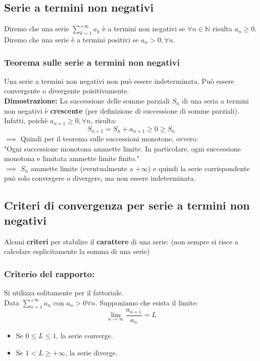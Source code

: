 \documentclass[../main.tex]{subfiles}
\begin{document}
\subsection{Serie a termini non negativi}
Diremo che una serie $\sum_{k=1}^{+\infty}a_k$ è a termini non negativi se
$\forall n\in \mathbb{N}$ risulta $a_n \geq 0$.\\ Diremo che una serie è a
termini positivi se $a_n>0, \forall n$.

\subsubsection{Teorema sulle serie a termini non negativi}
Una serie a termini non negativi non può essere indeterminata. Può essere
convergente o divergente poisitivamente.\\ \textbf{Dimostrazione:} La
successione delle somme parziali $S_n$ di una seria a termini non negativi è
\textbf{crescente} (per definizione di successione di somme parziali).\\
Infatti, poichè $a_{n+1}\geq 0, \forall n$, risulta:
\[
    S_{n+1} = S_n + a_{n+1} \geq 0 \geq S_n
\]
$\implies$ Quindi per il teorema sulle successioni monotone, ovvero:\\
"Ogni successione monotona ammette limite. In particolare, ogni successione monotona e limitata ammette limite finito."\\
$\implies$ $S_n$ ammette limite (eventualmente a $+\infty$) e quindi la serie corrispondente può solo convergere o divergere, ma non essere indeterminata.

\subsection{Criteri di convergenza per serie a termini non negativi}
Alcuni \textbf{criteri} per stabilire il \textbf{carattere} di una serie: (non
sempre si risce a calcolare esplicitamente la somma di una serie)

\subsubsection{Criterio del rapporto:}
Si utilizza solitamente per il fattoriale.\\ Data $\sum_{n=1}^{+\infty}a_n$ con
$a_n > 0 \forall n$. Supponiamo che esista il limite:
\[
    \lim_{n\to\infty}\dfrac{a_{n+1}}{a_n} = L
\]
\begin{itemize}
    \item Se $0\leq L \leq 1$, la serie converge.
    \item Se $1 < L \geq +\infty$, la serie diverge.
\end{itemize}
\end{document}
